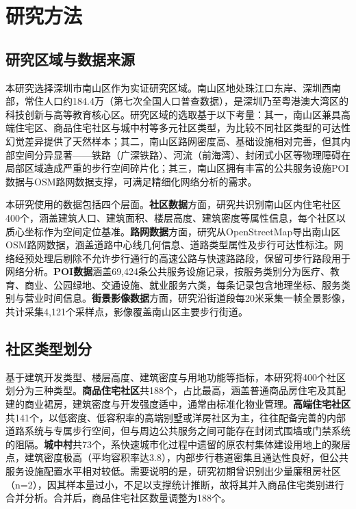 \documentclass[10pt,conference]{IEEEtran}
\begin{document}
\section{研究方法}
\label{sec:methodology}

\subsection{研究区域与数据来源}

本研究选择深圳市南山区作为实证研究区域。南山区地处珠江口东岸、深圳西南部，常住人口约184.4万（第七次全国人口普查数据），是深圳乃至粤港澳大湾区的科技创新与高等教育核心区。研究区域的选取基于以下考量：其一，南山区兼具高端住宅区、商品住宅社区与城中村等多元社区类型，为比较不同社区类型的可达性幻觉差异提供了天然样本；其二，南山区路网密度高、基础设施相对完善，但其内部空间分异显著——铁路（广深铁路）、河流（前海湾）、封闭式小区等物理障碍在局部区域造成严重的步行空间碎片化；其三，南山区拥有丰富的公共服务设施POI数据与OSM路网数据支撑，可满足精细化网络分析的需求。

本研究使用的数据包括四个层面。\textbf{社区数据}方面，研究共识别南山区内住宅社区400个，涵盖建筑人口、建筑面积、楼层高度、建筑密度等属性信息，每个社区以质心坐标作为空间定位基准。\textbf{路网数据}方面，研究从OpenStreetMap导出南山区OSM路网数据，涵盖道路中心线几何信息、道路类型属性及步行可达性标注。网络经预处理后剔除不允许步行通行的高速公路与快速路路段，保留可步行路段用于网络分析。\textbf{POI数据}涵盖69,424条公共服务设施记录，按服务类别分为医疗、教育、商业、公园绿地、交通设施、就业服务六类，每条记录包含地理坐标、服务类别与营业时间信息。\textbf{街景影像数据}方面，研究沿街道段每20米采集一帧全景影像，共计采集4,121个采样点，影像覆盖南山区主要步行街道。

\subsection{社区类型划分}

基于建筑开发类型、楼层高度、建筑密度与用地功能等指标，本研究将400个社区划分为三种类型。\textbf{商品住宅社区}共188个，占比最高，涵盖普通商品房住宅及其配建的商业裙房，建筑密度与开发强度适中，通常由标准化物业管理。\textbf{高端住宅社区}共141个，以低密度、低容积率的高端别墅或洋房社区为主，往往配备完善的内部道路系统与专属步行空间，但与周边公共服务之间可能存在封闭式围墙或门禁系统的阻隔。\textbf{城中村}共73个，系快速城市化过程中遗留的原农村集体建设用地上的聚居点，建筑密度极高（平均容积率达3.8），内部步行巷道密集且通达性良好，但公共服务设施配置水平相对较低。需要说明的是，研究初期曾识别出少量廉租房社区（n=2），因其样本量过小，不足以支撑统计推断，故将其并入商品住宅类别进行合并分析。合并后，商品住宅社区数量调整为188个。
\end{document}
